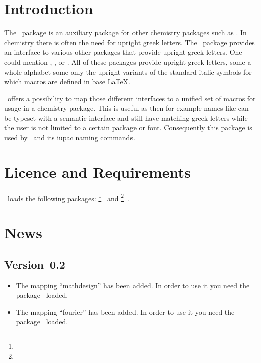 \documentclass[load-preamble+]{cnltx-doc}
\begin{document}
\section{Introduction}
The \chemgreek\ package is an auxiliary package for other chemistry packages
such as \chemmacros.  In chemistry there is often the need for upright greek
letters.  The \chemgreek\ package provides an interface to various other
packages that provide upright greek letters.  One could mention
, ,  or .  All of these
packages provide upright greek letters, some a whole alphabet some only the
upright variants of the standard italic symbols for which macros are defined
in base \LaTeX.

\chemgreek\ offers a possibility to map those different interfaces to a
unified set of macros for usage in a chemistry package.  This is useful as
then for example names like  can be typeset
with a semantic interface and still have matching greek letters while the user
is not limited to a certain package or font.  Consequently this package is
used by \chemmacros\ and its \acs{iupac} naming commands.

\section{Licence and Requirements}
\license

\chemgreek\ loads the following packages:
\footnote{}~\cite{bnd:l3kernel} and
\footnote{}~\cite{bnd:l3packages}.

\section{News}
\subsection{Version~0.2}
\begin{itemize}
  \item The mapping ``mathdesign'' has been added.  In order to use it you
    need the  package~\cite{pkg:mathdesign} loaded.
  \item The mapping ``fourier'' has been added.  In order to use it you
    need the  package~\cite{pkg:fourier} loaded.
\end{itemize}
\end{document}
